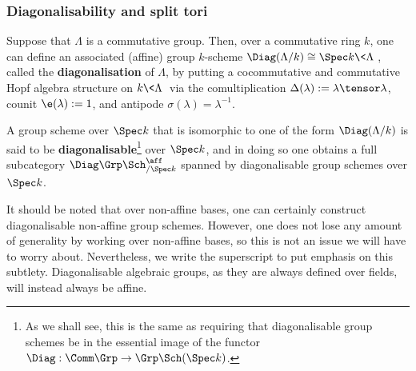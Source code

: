         \subsubsection{Diagonalisability and split tori}
            \begin{definition} \label{def: diagonalisable_group_schemes}
                Suppose that $\Lambda$ is a commutative group. Then, over a commutative ring $k$, one can define an associated (affine) group $k$-scheme $\Diag(\Lambda/k) \cong \Spec k\<\Lambda\>$, called the \textbf{diagonalisation} of $\Lambda$, by putting a cocommutative and commutative Hopf algebra structure on $k\<\Lambda\>$ via the comultiplication $\Delta(\lambda) := \lambda \tensor \lambda$, counit $\e(\lambda) := 1$, and antipode $\sigma(\lambda) = \lambda^{-1}$.
                
                A group scheme over $\Spec k$ that is isomorphic to one of the form $\Diag(\Lambda/k)$ is said to be \textbf{diagonalisable}\footnote{As we shall see, this is the same as requiring that diagonalisable group schemes be in the essential image of the functor $\Diag: \Comm\Grp \to \Grp\Sch(\Spec k)$.} over $\Spec k$, and in doing so one obtains a full subcategory $\Diag\Grp\Sch^{\aff}_{/\Spec k}$ spanned by diagonalisable group schemes over $\Spec k$.
            \end{definition}
            \begin{remark}
                It should be noted that over non-affine bases, one can certainly construct diagonalisable non-affine group schemes. However, one does not lose any amount of generality by working over non-affine bases, so this is not an issue we will have to worry about. Nevertheless, we write the \say{$\aff$} superscript to put emphasis on this subtlety. Diagonalisable algebraic groups, as they are always defined over fields, will instead always be affine.
            \end{remark}
